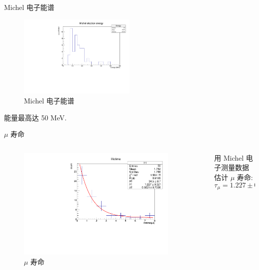 \documentclass[10pt]{beamer}
\begin{document}
\begin{frame}[label={sec:org6bb6e0c}]{Michel 电子能谱}
\begin{figure}[htbp]
\centering
\includegraphics[width=0.5\textwidth]{../../mu/michel/michel.pdf}
\caption{Michel 电子能谱}
\end{figure}
能量最高达 50 MeV.
\end{frame}

\begin{frame}[label={sec:org61f5564}]{\(\mu\) 寿命}
\begin{columns}
\begin{column}{0.5\columnwidth}
\begin{figure}[htbp]
\centering
\includegraphics[width=0.9\textwidth]{../../img/lifeHist.pdf}
\caption{\(\mu\) 寿命}
\end{figure}
\end{column}
\begin{column}{0.5\columnwidth}
用 Michel 电子测量数据估计 \(\mu\) 寿命:
\[\tau_{\mu} = 1.227 \pm \qty{0.321}{\mu s}.\]
\end{column}
\end{columns}
\end{frame}
\end{document}
